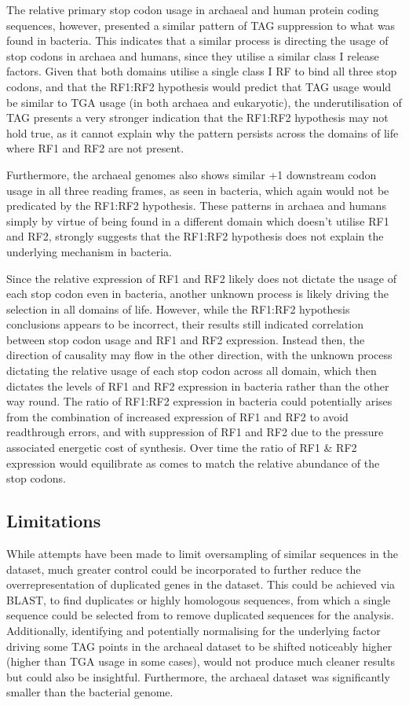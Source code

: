 \documentclass[../main.tex]{subfile}
\begin{document}
    The relative primary stop codon usage in archaeal and human protein coding sequences, however, presented a similar pattern of TAG suppression to what was found in bacteria. This indicates that a similar process is directing the usage of stop codons in archaea and humans, since they utilise a similar class I release factors. Given that both domains utilise a single class I RF to bind all three stop codons, and that the RF1:RF2 hypothesis would predict that TAG usage would be similar to TGA usage (in both archaea and eukaryotic), the underutilisation of TAG presents a very stronger indication that the RF1:RF2 hypothesis may not hold true, as it cannot explain why the pattern persists across the domains of life where RF1 and RF2 are not present.

    Furthermore, the archaeal genomes also shows similar +1 downstream codon usage in all three reading frames, as seen in bacteria, which again would not be predicated by the RF1:RF2 hypothesis.
    These patterns in archaea and humans simply by virtue of being found in a different domain which doesn't utilise RF1 and RF2, strongly suggests that the RF1:RF2 hypothesis does not explain the underlying mechanism in bacteria.

    Since the relative expression of RF1 and RF2 likely does not dictate the usage of each stop codon even in bacteria, another unknown process is likely driving the selection in all domains of life. However, while the RF1:RF2 hypothesis conclusions appears to be incorrect, their results still indicated correlation between stop codon usage and RF1 and RF2 expression. Instead then, the direction of causality may flow in the other direction, with the unknown process dictating the relative usage of each stop codon across all domain, which then dictates the levels of RF1 and RF2 expression in bacteria rather than the other way round. The ratio of RF1:RF2 expression in bacteria could potentially arises from the combination of increased expression of RF1 and RF2 to avoid readthrough errors, and with suppression of RF1 and RF2 due to the pressure associated energetic cost of synthesis. Over time the ratio of RF1 \& RF2 expression would equilibrate as comes to match the relative abundance of the stop codons.

    \subsection{Limitations}
        While attempts have been made to limit oversampling of similar sequences in the dataset, much greater control could be incorporated to further reduce the overrepresentation of duplicated genes in the dataset. This could be achieved via BLAST, to find duplicates or highly homologous sequences, from which a single sequence could be selected from to remove duplicated sequences for the analysis.
        Additionally, identifying and potentially normalising for the underlying factor driving some TAG points in the archaeal dataset to be shifted noticeably higher (higher than TGA usage in some cases), would not produce much cleaner results but could also be insightful.
        Furthermore, the archaeal dataset was significantly smaller than the bacterial genome.
\end{document}
